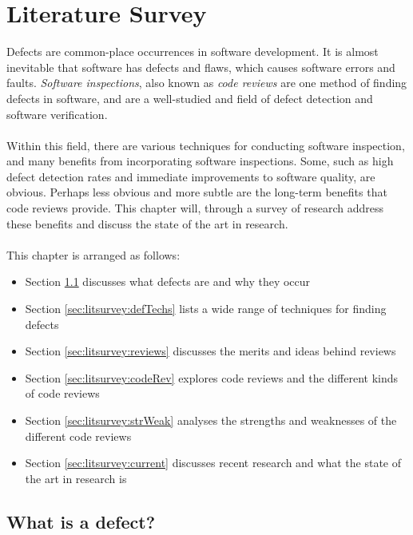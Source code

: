 \chapter{Literature Survey} \label{chapter:litsurvey}

Defects are common-place occurrences in software development.
It is almost inevitable that software has defects and flaws, which causes software errors and
faults.
{\em Software inspections}, also known as {\em code reviews} are one method of finding defects in
software, and are a well-studied and field of defect detection and software verification.\\
\\
Within this field, there are various techniques for conducting software inspection, and many
benefits from incorporating software inspections.
Some, such as high defect detection rates and immediate improvements to software quality, are
obvious.
Perhaps less obvious and more subtle are the long-term benefits that code reviews provide.
This chapter will, through a survey of research address these benefits and discuss the state of the
art in research.\\
\\
This chapter is arranged as follows:
\begin{itemize}
	\item Section \ref{sec:litsurvey:defect} discusses what defects are and why they occur
	\item Section \ref{sec:litsurvey:defTechs} lists a wide range of techniques for finding defects
	\item Section \ref{sec:litsurvey:reviews} discusses the merits and ideas behind reviews
	\item Section \ref{sec:litsurvey:codeRev} explores code reviews and the different kinds of code
		reviews
	\item Section \ref{sec:litsurvey:strWeak} analyses the strengths and weaknesses of the different
		code reviews
	\item Section \ref{sec:litsurvey:current} discusses recent research and what the state of the art
		in research is
\end{itemize}

\section{What is a defect?} \label{sec:litsurvey:defect}

